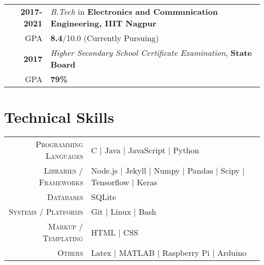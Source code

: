 \documentclass[a4paper,10pt]{extarticle} %
\begin{document}
\begin{tabular}{r|p{17.5cm}}	
\textbf{2017-2021} & \textit{B.Tech} in \textbf{Electronics and Communication Engineering, IIIT Nagpur}\\
\hfill GPA & \textbf{8.4}/10.0 (Currently Pursuing)\\
\textbf{2017} & \textit{Higher Secondary School Certificate Examination}, \textbf{State Board}\\
\hfill GPA & \textbf{79\%}\\
\end{tabular}


\section{\textcolor{primary}{Technical Skills}}

\begin{tabular}{r|p{15cm}}
\textsc{Programming Languages} & C | Java | JavaScript | Python  \\
\textsc{Libraries / Frameworks} & Node.js | Jekyll | Numpy | Pandas | Scipy | Tensorflow | Keras\\
\textsc{Databases} & SQLite \\
\textsc{Systems / Platforms} & Git | Linux | Bash\\
\textsc{Markup / Templating} & HTML | CSS \\
\textsc{Others} &  Latex | MATLAB | Raspberry Pi | Arduino
\end{tabular}



\end{document}
